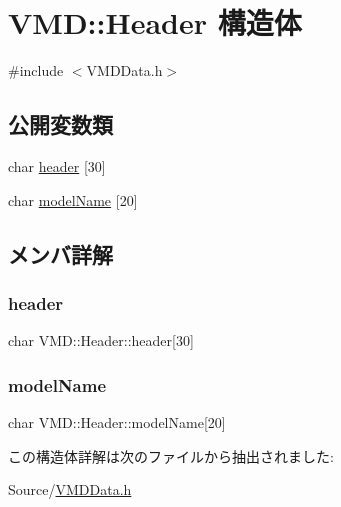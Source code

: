 \hypertarget{struct_v_m_d_1_1_header}{}\section{V\+MD\+:\+:Header 構造体}
\label{struct_v_m_d_1_1_header}


{\ttfamily \#include $<$V\+M\+D\+Data.\+h$>$}

\subsection*{公開変数類}
\begin{DoxyCompactItemize}
\item 
char \mbox{\hyperlink{struct_v_m_d_1_1_header_aacd617af72f51e9fcb5a3b6f0f922646}{header}} \mbox{[}30\mbox{]}
\item 
char \mbox{\hyperlink{struct_v_m_d_1_1_header_a6760ec81d65686d7dc25de5e257aa66b}{model\+Name}} \mbox{[}20\mbox{]}
\end{DoxyCompactItemize}


\subsection{メンバ詳解}
\mbox{\label{struct_v_m_d_1_1_header_aacd617af72f51e9fcb5a3b6f0f922646}} 
\subsubsection{\texorpdfstring{header}{header}}
{\footnotesize\ttfamily char V\+M\+D\+::\+Header\+::header\mbox{[}30\mbox{]}}

\mbox{\label{struct_v_m_d_1_1_header_a6760ec81d65686d7dc25de5e257aa66b}} 
\subsubsection{\texorpdfstring{model\+Name}{modelName}}
{\footnotesize\ttfamily char V\+M\+D\+::\+Header\+::model\+Name\mbox{[}20\mbox{]}}



この構造体詳解は次のファイルから抽出されました\+:\begin{DoxyCompactItemize}
\item 
Source/\mbox{\hyperlink{_v_m_d_data_8h}{V\+M\+D\+Data.\+h}}\end{DoxyCompactItemize}

